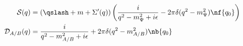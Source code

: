 \begin{equation}
\label{eq:fullprops}
\begin{split}
  \mathcal{S}(q)&=\left(\qslash+m+\Sigma'(q)\right)
  \left(\frac{i}{q^2-m_\Psi^2+i\epsilon}
    -2\pi\delta(q^2-m_\Psi^2)\nf{q_0}\right)\\
  \mathcal{D}_{A/B}(q)&=\frac{i}{q^2-m_{A/B}^2+i\epsilon}
  +2\pi\delta(q^2-m_{A/B}^2)\nb{q_0}
\end{split}
\end{equation} 

